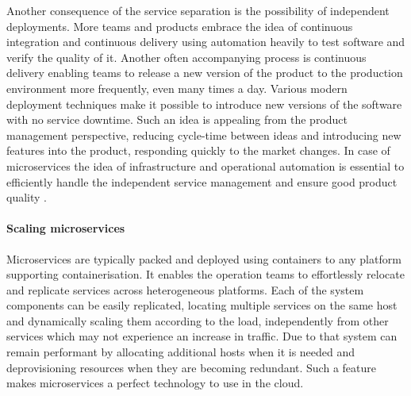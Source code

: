 Another consequence of the service separation is the possibility of independent deployments. More teams and products embrace the idea of continuous integration and continuous delivery using automation heavily to test software and verify the quality of it. Another often accompanying process is continuous delivery enabling teams to release a new version of the product to the production environment more frequently, even many times a day. Various modern deployment techniques make it possible to introduce new versions of the software with no service downtime. Such an idea is appealing from the product management perspective, reducing cycle-time between ideas and introducing new features into the product, responding quickly to the market changes. In case of microservices the idea of infrastructure and operational automation is essential to efficiently handle the independent service management and ensure good product quality \cite{FowlerMicroservicesTradeoffs}.

\paragraph{Scaling microservices}

Microservices are typically packed and deployed using containers to any platform supporting containerisation. It enables the operation teams to effortlessly relocate and replicate services across heterogeneous platforms. Each of the system components can be easily replicated, locating multiple services on the same host and dynamically scaling them according to the load, independently from other services which may not experience an increase in traffic. Due to that system can remain performant by allocating additional hosts when it is needed and deprovisioning resources when they are becoming redundant. Such a feature makes microservices a perfect technology to use in the cloud.

